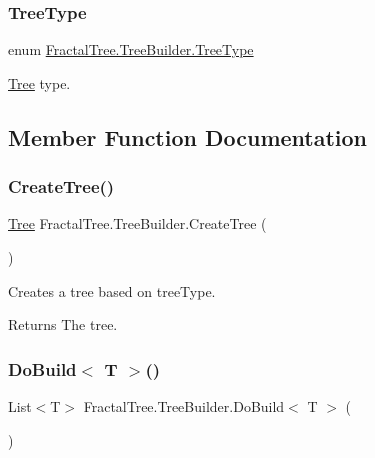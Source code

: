 \subsubsection{\texorpdfstring{Tree\+Type}{TreeType}}
{\footnotesize\ttfamily enum \hyperlink{class_fractal_tree_1_1_tree_builder_a955d67cfa976440cc427e591be74f979}{Fractal\+Tree.\+Tree\+Builder.\+Tree\+Type}\hspace{0.3cm}{\ttfamily [strong]}}



\hyperlink{interface_fractal_tree_1_1_tree}{Tree} type. 



\subsection{Member Function Documentation}
\hypertarget{class_fractal_tree_1_1_tree_builder_a8bea11ef52d57a75292efd34e6f40779}{}\label{class_fractal_tree_1_1_tree_builder_a8bea11ef52d57a75292efd34e6f40779} 
\subsubsection{\texorpdfstring{Create\+Tree()}{CreateTree()}}
{\footnotesize\ttfamily \hyperlink{interface_fractal_tree_1_1_tree}{Tree} Fractal\+Tree.\+Tree\+Builder.\+Create\+Tree (\begin{DoxyParamCaption}{ }\end{DoxyParamCaption})\hspace{0.3cm}{\ttfamily [protected]}}



Creates a tree based on tree\+Type. 

\begin{DoxyReturn}{Returns}
The tree.
\end{DoxyReturn}
\hypertarget{class_fractal_tree_1_1_tree_builder_aa2d0ae2616577e6c0cdf7e68cdf4dffb}{}\label{class_fractal_tree_1_1_tree_builder_aa2d0ae2616577e6c0cdf7e68cdf4dffb} 
\subsubsection{\texorpdfstring{Do\+Build$<$ T $>$()}{DoBuild< T >()}}
{\footnotesize\ttfamily List$<$T$>$ Fractal\+Tree.\+Tree\+Builder.\+Do\+Build$<$ T $>$ (\begin{DoxyParamCaption}{ }\end{DoxyParamCaption})\hspace{0.3cm}{\ttfamily [protected]}}




